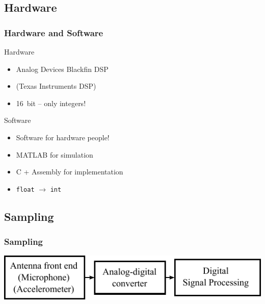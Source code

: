 \subsection{Hardware}
\begin{frame}
    \frametitle{Hardware and Software}
    \begin{block}{Hardware}
        \begin{itemize}
        \item Analog Devices Blackfin DSP
        \item (Texas Instruments DSP)
        \item \SI{16}{bit} -- only integers!
        \end{itemize}
    \end{block}

    \pause
    \begin{block}{Software}
        \begin{itemize}
        \item Software for hardware people!
        \item MATLAB for simulation
        \item C + Assembly for implementation
        \item \texttt{float} $\rightarrow$ \texttt{int}
        \end{itemize}
    \end{block}
\end{frame}

\subsection{Sampling}
\begin{frame}
    \frametitle{Sampling}
    \begin{center}
        \includegraphics{img/sdr_1}
    \end{center}
\end{frame}
